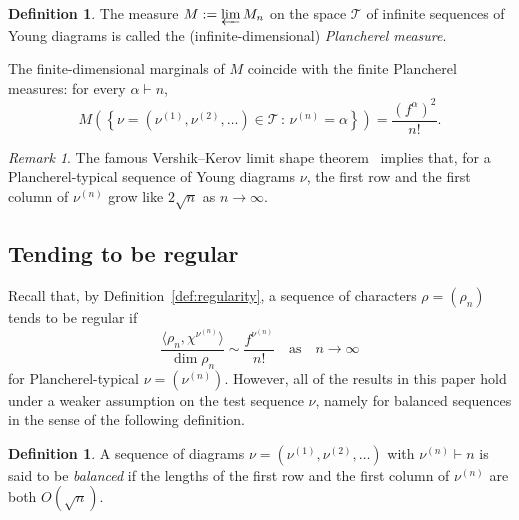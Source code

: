 \documentclass[12pt]%
{amsart}
\newcommand{\al}{{\alpha}}
\theoremstyle{plain}
\theoremstyle{definition}
\newtheorem{definition}[theorem]{Definition}
\theoremstyle{remark}
\newtheorem{remark}[theorem]{Remark}
\begin{document}
\begin{definition}
The measure $M:=\varprojlim M_n$ on the
space ${\mathcal T}$ of infinite sequences of Young diagrams is called the (infinite-dimensional) {\em Plancherel measure}.  
\end{definition}

The finite-dimensional marginals of $M$ coincide with the finite Plancherel measures: for every $\al \vdash n$,
\[
M \left( \left\{\nu =(\nu^{(1)},\nu^{(2)},\ldots) \in {\mathcal T} \,:\, \nu^{(n)} = \al \right\} \right) = \frac{(f^\al)^2}{n!}.
\]

\begin{remark}\label{rem:Plancherel_is_balanced}
    The famous Vershik--Kerov limit shape theorem~\cite{VershikKerovPlanch} implies that, for 
    a Plancherel-typical
    sequence of Young diagrams $\nu$, the first row and the first column of $\nu^{(n)}$ grow like $2\sqrt n$  as $n\to\infty$.
\end{remark}



\subsection{Tending to be regular}

Recall that, by Definition~\ref{def:regularity},
a sequence of characters $\rho = (\rho_n)$ tends to be regular if 
    \begin{equation}\label{eq:tends_to_regular2}
        \frac{\langle \rho_n,\chi^{\nu^{(n)}} \rangle}{\dim\rho_n}
        \sim \frac{f^{\nu^{(n)}}}{n!}
        \quad \text{as} \quad n\to\infty
    \end{equation}
for Plancherel-typical $\nu = (\nu^{(n)})$.  
However, all of the results in this paper hold under a weaker assumption on the test sequence $\nu$, namely for balanced sequences in the sense of the following definition.

\begin{definition}\label{def:balanced}\cite{DousseFeray}
    A sequence of diagrams $\nu =(\nu^{(1)},\nu^{(2)},\ldots)$ with $\nu^{(n)} \vdash n$ is said to be {\em balanced} if the lengths of the first row and the first column of $\nu^{(n)}$ are both $O(\sqrt n)$.
\end{definition}
\end{document}
